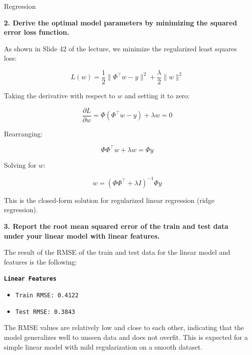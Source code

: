 \documentclass[
	english,
        solution=true
	]{tudaexercise}
\begin{document}
\begin{task}[points=34]{Regression}
\begin{subtask}[points=8, title=Linear Features]
\begin{solution}
            \vspace{2em}

            \textbf{2. Derive the optimal model parameters by minimizing the squared error loss function.}

            As shown in Slide 42 of the lecture, we minimize the regularized least squares loss:

            \[
            L(w) = \frac{1}{2} \|\Phi^\top w - y\|^2 + \frac{\lambda}{2} \|w\|^2
            \]

            Taking the derivative with respect to $w$ and setting it to zero:

            \[
            \frac{\partial L}{\partial w} = \Phi(\Phi^\top w - y) + \lambda w = 0
            \]

            Rearranging:

            \[
            \Phi \Phi^\top w + \lambda w = \Phi y
            \]

            Solving for $w$:

            \[
            w = (\Phi \Phi^\top + \lambda I)^{-1} \Phi y
            \]

            This is the closed-form solution for regularized linear regression (ridge regression).

            \vspace{2em}

            \textbf{3. Report the root mean squared error of the train and test data under your linear model with linear features.}

            The result of the RMSE of the train and test data for the linear model and features is the following:

            \vspace{1em}

            \textbf{\texttt{Linear Features}}
            \begin{itemize}
                \item \texttt{Train RMSE: 0.4122}
                \item \texttt{Test RMSE: 0.3843}
            \end{itemize}

            \vspace{1em}

            The RMSE values are relatively low and close to each other, indicating that the model generalizes well to unseen data and does not overfit.
            This is expected for a simple linear model with mild regularization on a smooth dataset.


\end{solution}
\end{subtask}
\end{task}
\end{document}
